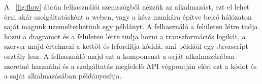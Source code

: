 A ~\ref{fig:flow} ábrán felhasználói szemszögből nézzük az alkalmazást, ezt el lehet érni akár szolgáltatásként a weben, vagy a kész munkára építve belső hálózaton saját magunk üzemeltethetünk egy példányt. A felhasználó a felületen létre tudja hozni a diagramot és a felületen létre tudja hozni a transzformációs logikát, a szerver majd értelmezi a kettőt és lefordítja kóddá, ami példáúl egy Javascript osztály lesz. A felhasználó majd ezt a komponenst a saját alkalmazásában szeretné használni és a szolgáltatás megfelelő API végpontján eléri ezt a kódot és a saját alkalmazásában példányosítja.



